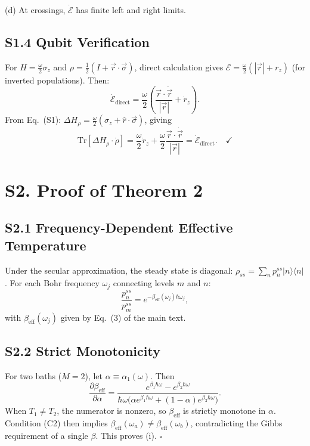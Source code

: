 \documentclass[prl,twocolumn,superscriptaddress,amsmath,amssymb]{revtex4-2}
\begin{document}
(d) At crossings, $\dot{\mathcal{E}}$ has finite left and right limits.

\subsection{S1.4 Qubit Verification}

For $H = \frac{\omega}{2}\sigma_z$ and $\rho = \frac{1}{2}(I + \vec{r}\cdot\vec\sigma)$, direct calculation gives $\mathcal{E} = \frac{\omega}{2}(|\vec{r}| + r_z)$ (for inverted populations). Then:
\begin{equation}
\dot{\mathcal{E}}_{\mathrm{direct}} = \frac{\omega}{2}\left(\frac{\vec{r}\cdot\dot{\vec{r}}}{|\vec{r}|} + \dot r_z\right).
\end{equation}
From Eq.~(S1): $\Delta H_\rho = \frac{\omega}{2}(\sigma_z + \hat{r}\cdot\vec\sigma)$, giving
\begin{equation}
\mathrm{Tr}[\Delta H_\rho \cdot \dot\rho] = \frac{\omega}{2}\dot r_z + \frac{\omega}{2}\frac{\vec{r}\cdot\dot{\vec{r}}}{|\vec{r}|} = \dot{\mathcal{E}}_{\mathrm{direct}}. \quad \checkmark
\end{equation}

\section{S2. Proof of Theorem 2}

\subsection{S2.1 Frequency-Dependent Effective Temperature}

Under the secular approximation, the steady state is diagonal: $\rho_{ss} = \sum_n p_n^{ss}|n\rangle\langle n|$. For each Bohr frequency $\omega_j$ connecting levels $m$ and $n$:
\begin{equation}
\frac{p_n^{ss}}{p_m^{ss}} = e^{-\beta_{\mathrm{eff}}(\omega_j)\hbar\omega_j},
\end{equation}
with $\beta_{\mathrm{eff}}(\omega_j)$ given by Eq.~(3) of the main text.

\subsection{S2.2 Strict Monotonicity}

For two baths ($M=2$), let $\alpha \equiv \alpha_1(\omega)$. Then
\begin{equation}
\frac{\partial\beta_{\mathrm{eff}}}{\partial\alpha} = \frac{e^{\beta_1\hbar\omega} - e^{\beta_2\hbar\omega}}{\hbar\omega\bigl(\alpha e^{\beta_1\hbar\omega} + (1-\alpha)e^{\beta_2\hbar\omega}\bigr)}.
\end{equation}
When $T_1 \neq T_2$, the numerator is nonzero, so $\beta_{\mathrm{eff}}$ is strictly monotone in $\alpha$. Condition (C2) then implies $\beta_{\mathrm{eff}}(\omega_a) \neq \beta_{\mathrm{eff}}(\omega_b)$, contradicting the Gibbs requirement of a single $\beta$. This proves (i). $\square$
\end{document}
